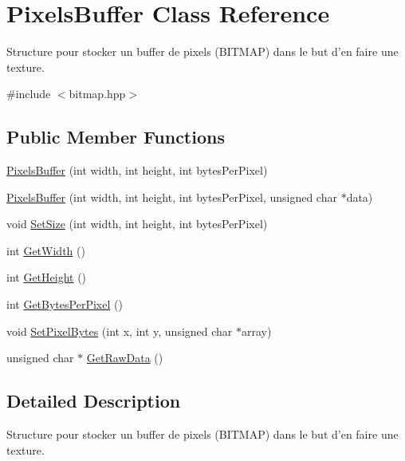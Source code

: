\hypertarget{class_pixels_buffer}{\section{Pixels\+Buffer Class Reference}
\label{class_pixels_buffer}
}


Structure pour stocker un buffer de pixels (B\+I\+T\+M\+A\+P) dans le but d'en faire une texture.  




{\ttfamily \#include $<$bitmap.\+hpp$>$}

\subsection*{Public Member Functions}
\begin{DoxyCompactItemize}
\item 
\hyperlink{class_pixels_buffer_ad21a6f7f2212b83062d429b156065a92}{Pixels\+Buffer} (int width, int height, int bytes\+Per\+Pixel)
\item 
\hyperlink{class_pixels_buffer_ac177037ebe836461b4f5ee3439ac7a98}{Pixels\+Buffer} (int width, int height, int bytes\+Per\+Pixel, unsigned char $\ast$data)
\item 
void \hyperlink{class_pixels_buffer_a074c37ff55e58712010843af4622aa55}{Set\+Size} (int width, int height, int bytes\+Per\+Pixel)
\item 
int \hyperlink{class_pixels_buffer_a7504098d27aa0b8076b7bae1911425d2}{Get\+Width} ()
\item 
int \hyperlink{class_pixels_buffer_aeec4875bde08cb334b93466129a2b162}{Get\+Height} ()
\item 
int \hyperlink{class_pixels_buffer_ae3dba897b0ffeda22c40f0c54bbe21f8}{Get\+Bytes\+Per\+Pixel} ()
\item 
void \hyperlink{class_pixels_buffer_a2884ff998f9b7d90c94221826e0df87a}{Set\+Pixel\+Bytes} (int x, int y, unsigned char $\ast$array)
\item 
unsigned char $\ast$ \hyperlink{class_pixels_buffer_a5f0b9cb1efaf465c0ec9679a9f7627a9}{Get\+Raw\+Data} ()
\end{DoxyCompactItemize}


\subsection{Detailed Description}
Structure pour stocker un buffer de pixels (B\+I\+T\+M\+A\+P) dans le but d'en faire une texture. 

